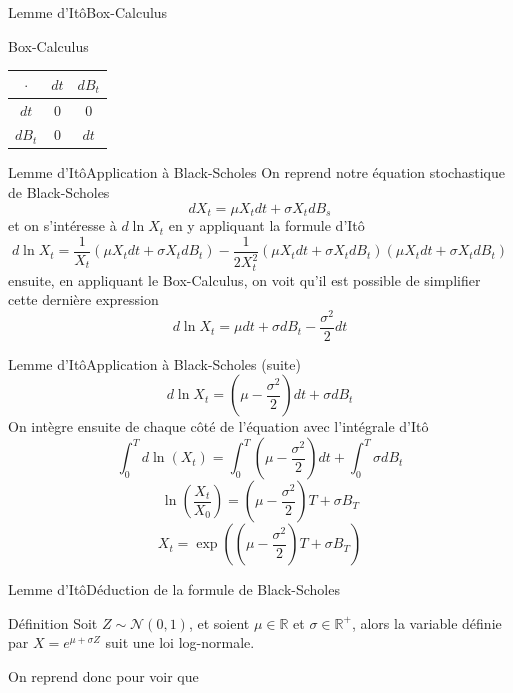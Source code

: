 \documentclass{beamer}
\newcommand{\1}{\mathmybb{1}}
\begin{document}
     \begin{frame}{Lemme d'Itô}{Box-Calculus}
       \begin{block}{Box-Calculus}
         \begin{center}
           \begin{tabular}{|c|c|c|}
             \hline
             $\cdot$ & $dt$ & $dB_t$ \\
             \hline
             $dt$ & 0 & 0 \\
             $dB_{t}$ & 0 & $dt$ \\
             \hline
           \end{tabular}
         \end{center}
         \end{block}
       \end{frame}
   \begin{frame}{Lemme d'Itô}{Application à Black-Scholes}
     On reprend notre équation stochastique de Black-Scholes
     \begin{equation}
       dX_{t} = \mu X_{t} dt + \sigma X_{t} dB_{s}
     \end{equation}
     \pause
     et on s'intéresse à $d \ln X_{t}$ en y appliquant la formule d'Itô
     \[
       d \ln X_{t} = \frac{1}{X_{t}} \left( \mu X_{t} dt + \sigma X_{t} dB_{t} \right) - \frac{1}{2X_{t}^{2}} \left( \mu X_{t} dt + \sigma X_{t} dB_{t} \right) \left( \mu X_{t}dt + \sigma X_{t} dB_{t}\right)
     \]
     \pause
     ensuite, en appliquant le Box-Calculus, on voit qu'il est possible de simplifier cette dernière expression
     \begin{equation}
       d \ln X_{t} =  \mu dt + \sigma dB_{t} - \frac{\sigma^{2}}{2} dt
     \end{equation}
   \end{frame}
   \begin{frame}{Lemme d'Itô}{Application à Black-Scholes (suite)}
     \[
       d \ln X_{t} = \left( \mu - \frac{\sigma^{2}}{2} \right) dt + \sigma dB_{t}
     \]
     \pause
     On intègre ensuite de chaque côté de l'équation avec l'intégrale d'Itô
     \[
       \int_{0}^{T} d \ln \left(  X_{t} \right) = \int_{0}^{T} \left(\mu - \frac{\sigma^{2}}{2} \right) dt + \int_{0}^{T} \sigma dB_{t}
     \]
     \pause
     \[
       \ln \left(\frac{X_{t}}{X_{0}} \right) = \left( \mu - \frac{\sigma^{2}}{2} \right) T + \sigma B_{T}
     \]
     \pause
     \begin{equation} \label{lognor}
       X_{t} = \exp \left(  \left( \mu - \frac{\sigma^{2}}{2} \right) T + \sigma B_{T} \right)
     \end{equation}
   \end{frame}
   \begin{frame}{Lemme d'Itô}{Déduction de la formule de Black-Scholes}
     \begin{block}{Définition}
       Soit $Z \sim \mathcal{N}\left(0, 1 \right)$, et soient $\mu \in \mathbb{R}$ et $\sigma \in \mathbb{R}^{+}$, alors la variable définie par $ X = e^{\mu + \sigma Z}$ suit une loi log-normale.
     \end{block}
     On reprend donc \label{lognor} pour voir que
   \end{frame}
\end{document}
